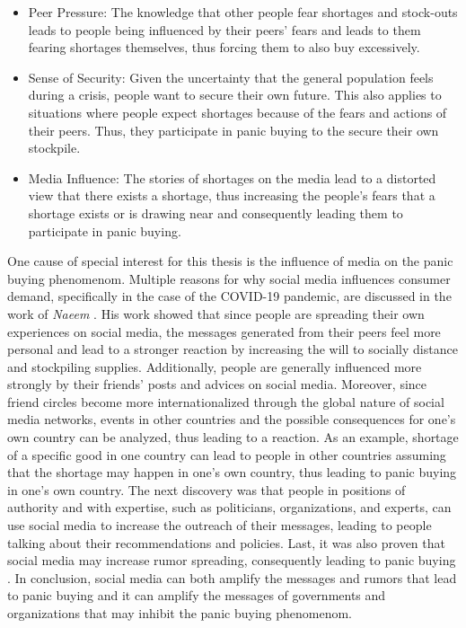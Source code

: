 \begin{itemize}
    \item Peer Pressure: The knowledge that other people fear shortages and 
    stock-outs leads to people being influenced by their peers' fears and leads
    to them fearing shortages themselves, thus forcing them to also buy excessively.
    \item Sense of Security: Given the uncertainty that the general population
    feels during a crisis, people want to secure their own future. This 
    also applies to situations where people expect 
    shortages because of the fears and actions of their peers.
    Thus, they participate in panic buying to the secure their
    own stockpile.
    \item Media Influence: The stories of shortages on the media
    lead to a distorted view that there exists a shortage, thus increasing 
    the people's fears that a shortage exists or is drawing near and consequently
    leading them to participate in panic buying.
\end{itemize}

One cause of special interest for this thesis is the influence of 
media on the panic buying phenomenom. 
Multiple reasons for why social media influences consumer demand, 
specifically in the case of the COVID-19 pandemic,
are discussed in the work of \textit{Naeem} \cite{naeem2021social}.
His work showed that since people are spreading their 
own experiences on social media, the messages generated from their peers feel
more personal and lead to a stronger reaction by increasing the will to 
socially distance and stockpiling supplies. Additionally, people are generally
influenced more strongly by their friends' posts and advices on social media.
Moreover, since friend circles become more 
internationalized through the global nature of social media networks,
events in other countries and the
possible consequences for one's own country can be analyzed, thus
leading to a reaction. As an example,
shortage of a specific good in one country can lead to people in other countries
assuming that the shortage may happen in one's own country, thus leading to 
panic buying in one's own country. 
The next discovery was that people in positions of authority and with expertise,
such as politicians, organizations, and experts, can use social media to increase 
the outreach of their messages, leading to people talking about their 
recommendations and policies.
Last, it was also proven that social media may increase rumor spreading,
consequently leading to panic buying \cite{naeem2022understanding}.
In conclusion, social media can both amplify the messages and rumors that lead to 
panic buying and it can amplify the messages of governments and organizations 
that may inhibit the panic buying phenomenom.



